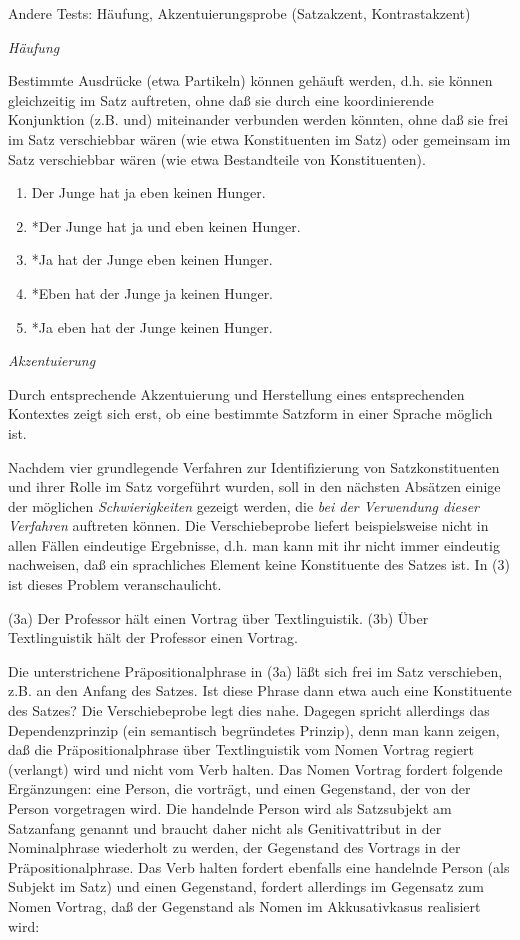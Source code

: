 \documentclass[
]{article}
\providecommand{\tightlist}{%
  \setlength{\itemsep}{0pt}\setlength{\parskip}{0pt}}
\begin{document}
Andere Tests:
Häufung, Akzentuierungsprobe (Satzakzent, Kontrastakzent)

\emph{Häufung}

Bestimmte Ausdrücke (etwa Partikeln) können gehäuft werden, d.h. sie können gleichzeitig im Satz auftreten, ohne daß sie durch eine koordinierende Konjunktion (z.B. und) miteinander verbunden werden könnten, ohne daß sie frei im Satz verschiebbar wären (wie etwa Konstituenten im Satz) oder gemeinsam im Satz verschiebbar wären (wie etwa Bestandteile von Konstituenten).

\begin{enumerate}
\def\labelenumi{(\arabic{enumi})}
\tightlist
\item
  Der Junge hat ja eben keinen Hunger.
\item
  *Der Junge hat ja und eben keinen Hunger.
\item
  *Ja hat der Junge eben keinen Hunger.
\item
  *Eben hat der Junge ja keinen Hunger.
\item
  *Ja eben hat der Junge keinen Hunger.
\end{enumerate}

\emph{Akzentuierung}

Durch entsprechende Akzentuierung und Herstellung eines entsprechenden Kontextes zeigt sich erst, ob eine bestimmte Satzform in einer Sprache möglich ist.

Nachdem vier grundlegende Verfahren zur Identifizierung von Satzkonstituenten und ihrer Rolle im Satz vorgeführt wurden, soll in den nächsten Absätzen einige der möglichen \emph{Schwierigkeiten} gezeigt werden, die \emph{bei der Verwendung dieser Verfahren} auftreten können. Die Verschiebeprobe liefert beispielsweise nicht in allen Fällen eindeutige Ergebnisse, d.h. man kann mit ihr nicht immer eindeutig nachweisen, daß ein sprachliches Element keine Konstituente des Satzes ist. In (3) ist dieses Problem veranschaulicht.

(3a) Der Professor hält einen Vortrag über Textlinguistik.
(3b) Über Textlinguistik hält der Professor einen Vortrag.

Die unterstrichene Präpositionalphrase in (3a) läßt sich frei im Satz verschieben, z.B. an den Anfang des Satzes. Ist diese Phrase dann etwa auch eine Konstituente des Satzes? Die Verschiebeprobe legt dies nahe. Dagegen spricht allerdings das Dependenzprinzip (ein semantisch begründetes Prinzip), denn man kann zeigen, daß die Präpositionalphrase über Textlinguistik vom Nomen Vortrag regiert (verlangt) wird und nicht vom Verb halten. Das Nomen Vortrag fordert folgende Ergänzungen: eine Person, die vorträgt, und einen Gegenstand, der von der Person vorgetragen wird. Die handelnde Person wird als Satzsubjekt am Satzanfang genannt und braucht daher nicht als Genitivattribut in der Nominalphrase wiederholt zu werden, der Gegenstand des Vortrags in der Präpositionalphrase. Das Verb halten fordert ebenfalls eine handelnde Person (als Subjekt im Satz) und einen Gegenstand, fordert allerdings im Gegensatz zum Nomen Vortrag, daß der Gegenstand als Nomen im Akkusativkasus realisiert wird:
\end{document}
